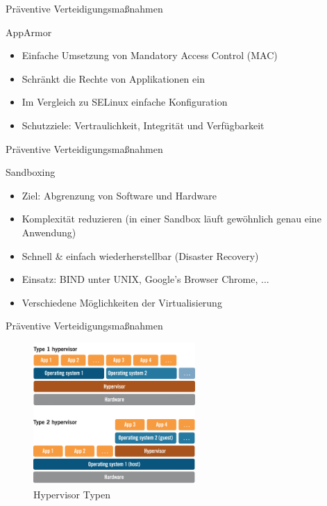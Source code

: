 \begin{frame}{Präventive Verteidigungsmaßnahmen}
  \begin{block}{AppArmor}
    \begin{itemize}[<+->]
      \item Einfache Umsetzung von Mandatory Access Control (MAC)
      \item Schränkt die Rechte von Applikationen ein
      \item Im Vergleich zu SELinux einfache Konfiguration
      \item Schutzziele: Vertraulichkeit, Integrität und Verfügbarkeit
    \end{itemize}
  \end{block}
\end{frame}

\begin{frame}{Präventive Verteidigungsmaßnahmen}
  \begin{block}{Sandboxing}
    \begin{itemize}[<+->]
      \item Ziel: Abgrenzung von Software und Hardware
      \item Komplexität reduzieren (in einer Sandbox läuft gewöhnlich genau eine Anwendung)
      \item Schnell \& einfach wiederherstellbar (Disaster Recovery)
      \item Einsatz: BIND unter UNIX, Google's Browser Chrome, ...
      \item Verschiedene Möglichkeiten der Virtualisierung
    \end{itemize}
  \end{block}
\end{frame}

\begin{frame}{Präventive Verteidigungsmaßnahmen}
  \begin{figure}
    \centering
    \includegraphics[width=0.55\textwidth]{assets/hypervisor}
    \caption{Hypervisor Typen \footnotemark}
  \end{figure}

\end{frame}


